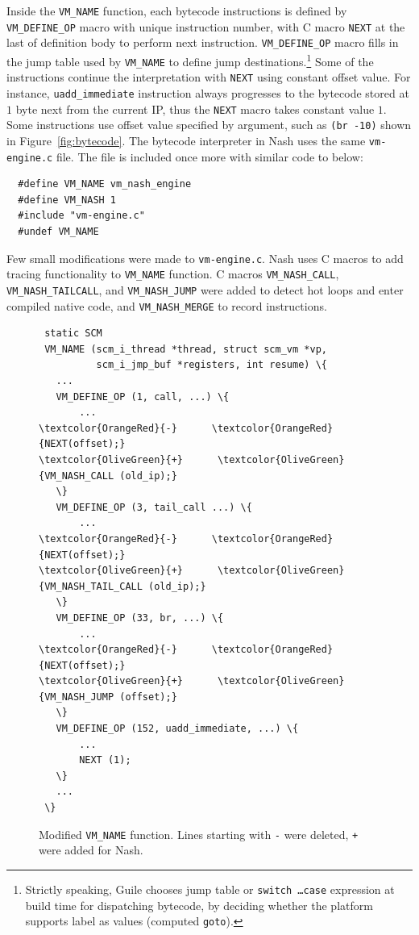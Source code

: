 \documentclass[preprint, 10pt]{sigplanconf}
\begin{document}
Inside the \texttt{VM\_NAME} function, each bytecode instructions is defined
by \texttt{VM\_DEFINE\_OP} macro with unique instruction number, with C macro
\texttt{NEXT} at the last of definition body to perform next
instruction. \texttt{VM\_DEFINE\_OP} macro fills in the jump table used by
\texttt{VM\_NAME} to define jump destinations.\footnote{Strictly speaking,
  Guile chooses jump table or \texttt{switch \ldots\@ case} expression at
  build time for dispatching bytecode, by deciding whether the platform
  supports label as values (computed \texttt{goto}).}  Some of the
instructions continue the interpretation with \texttt{NEXT} using constant
offset value. For instance, \texttt{uadd\_immediate} instruction always
progresses to the bytecode stored at $1$ byte next from the current IP, thus
the \texttt{NEXT} macro takes constant value $1$. Some instructions use offset
value specified by argument, such as \texttt{(br -10)} shown in
Figure~\hyperref[fig:bytecode]{\ref{fig:bytecode}}.  The bytecode interpreter
in Nash uses the same \texttt{vm-engine.c} file. The file is included once
more with similar code to below:

\begin{verbatim}
  #define VM_NAME vm_nash_engine
  #define VM_NASH 1
  #include "vm-engine.c"
  #undef VM_NAME
\end{verbatim}

Few small modifications were made to \texttt{vm-engine.c}. Nash uses C macros
to add tracing functionality to \texttt{VM\_NAME} function. C macros
\texttt{VM\_NASH\_CALL}, \texttt{VM\_NASH\_TAILCALL}, and
\texttt{VM\_NASH\_JUMP} were added to detect hot loops and enter compiled
native code, and \texttt{VM\_NASH\_MERGE} to record instructions.

\begin{figure}
  \centering
  \small
\begin{Verbatim}
 static SCM
 VM_NAME (scm_i_thread *thread, struct scm_vm *vp,
          scm_i_jmp_buf *registers, int resume) \{
   ...
   VM_DEFINE_OP (1, call, ...) \{
       ...
\textcolor{OrangeRed}{-}      \textcolor{OrangeRed}{NEXT(offset);}
\textcolor{OliveGreen}{+}      \textcolor{OliveGreen}{VM_NASH_CALL (old_ip);}
   \}
   VM_DEFINE_OP (3, tail_call ...) \{
       ...
\textcolor{OrangeRed}{-}      \textcolor{OrangeRed}{NEXT(offset);}
\textcolor{OliveGreen}{+}      \textcolor{OliveGreen}{VM_NASH_TAIL_CALL (old_ip);}
   \}
   VM_DEFINE_OP (33, br, ...) \{
       ...
\textcolor{OrangeRed}{-}      \textcolor{OrangeRed}{NEXT(offset);}
\textcolor{OliveGreen}{+}      \textcolor{OliveGreen}{VM_NASH_JUMP (offset);}
   \}
   VM_DEFINE_OP (152, uadd_immediate, ...) \{
       ...
       NEXT (1);
   \}
   ...
 \}
\end{Verbatim}
\caption{Modified \texttt{VM\_NAME} function. Lines starting with \texttt{-}
  were deleted, \texttt{+} were added for Nash.}
\label{fig:vmnamenash}
\end{figure}
\end{document}

